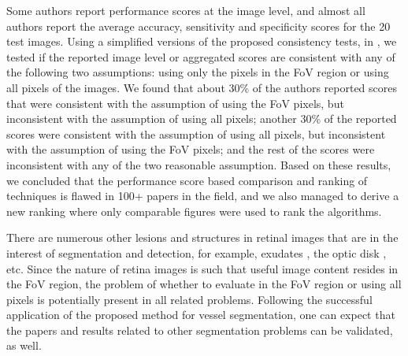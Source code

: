 \documentclass[5p, final]{elsarticle}
\begin{document}
Some authors report performance scores at the image level, and almost all authors report the average accuracy, sensitivity and specificity scores for the 20 test images. Using a simplified versions of the proposed consistency tests, in \cite{vessel}, we tested if the reported image level or aggregated scores are consistent with any of the following two assumptions: using only the pixels in the FoV region or using all pixels of the images. We found that about 30\% of the authors reported scores that were consistent with the assumption of using the FoV pixels, but inconsistent with the assumption of using all pixels; another 30\% of the reported scores were consistent with the assumption of using all pixels, but inconsistent with the assumption of using the FoV pixels; and the rest of the scores were inconsistent with any of the two reasonable assumption. Based on these results, we concluded that the performance score based comparison and ranking of techniques is flawed in 100+ papers in the field, and we also managed to derive a new ranking where only comparable figures were used to rank the algorithms.

There are numerous other lesions and structures in retinal images that are in the interest of segmentation and detection, for example, exudates \cite{exu}, the optic disk \cite{od}, etc. Since the nature of retina images is such that useful image content resides in the FoV region, the problem of whether to evaluate in the FoV region or using all pixels is potentially present in all related problems. Following the successful application of the proposed method for vessel segmentation, one can expect that the papers and results related to other segmentation problems can be validated, as well.
\end{document}
